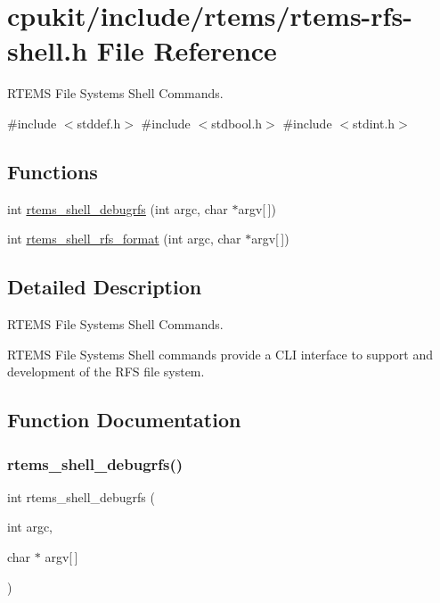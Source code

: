 \hypertarget{rtems-rfs-shell_8h}{}\section{cpukit/include/rtems/rtems-\/rfs-\/shell.h File Reference}
\label{rtems-rfs-shell_8h}


R\+T\+E\+MS File Systems Shell Commands.  


{\ttfamily \#include $<$stddef.\+h$>$}\newline
{\ttfamily \#include $<$stdbool.\+h$>$}\newline
{\ttfamily \#include $<$stdint.\+h$>$}\newline
\subsection*{Functions}
\begin{DoxyCompactItemize}
\item 
int \mbox{\hyperlink{rtems-rfs-shell_8h_a39d9f39a696171d278ab3fb462043af6}{rtems\+\_\+shell\+\_\+debugrfs}} (int argc, char $\ast$argv\mbox{[}$\,$\mbox{]})
\item 
int \mbox{\hyperlink{rtems-rfs-shell_8h_a75c5255512bc39c837a5d516ef4356c2}{rtems\+\_\+shell\+\_\+rfs\+\_\+format}} (int argc, char $\ast$argv\mbox{[}$\,$\mbox{]})
\end{DoxyCompactItemize}


\subsection{Detailed Description}
R\+T\+E\+MS File Systems Shell Commands. 

R\+T\+E\+MS File Systems Shell commands provide a C\+LI interface to support and development of the R\+FS file system. 

\subsection{Function Documentation}
\mbox{\label{rtems-rfs-shell_8h_a39d9f39a696171d278ab3fb462043af6}} 
\subsubsection{\texorpdfstring{rtems\_shell\_debugrfs()}{rtems\_shell\_debugrfs()}}
{\footnotesize\ttfamily int rtems\+\_\+shell\+\_\+debugrfs (\begin{DoxyParamCaption}\item[{int}]{argc,  }\item[{char $\ast$}]{argv\mbox{[}$\,$\mbox{]} }\end{DoxyParamCaption})}

